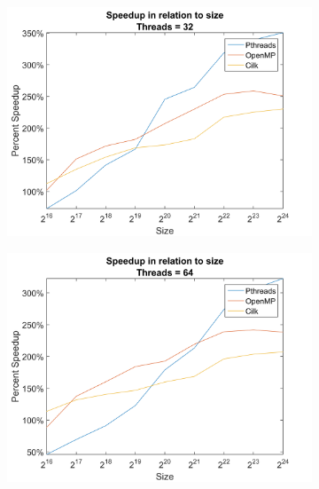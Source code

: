 \documentclass[11pt,a4paper,titlepage]{article}
\begin{document}
		\begin{figure}[h!]
			\ContinuedFloat
			\centering
			\begin{subfigure}[b]{0.45\textwidth}
				\includegraphics[width=\textwidth]{figures/figure-4.5.png}
				\caption{}
			\end{subfigure}
			\begin{subfigure}[b]{0.45\textwidth}
				\includegraphics[width=\textwidth]{figures/figure-4.6.png}
				\caption{}
			\end{subfigure}						
			\begin{subfigure}[b]{0.45\textwidth}

\end{subfigure}
\end{figure}
\end{document}
